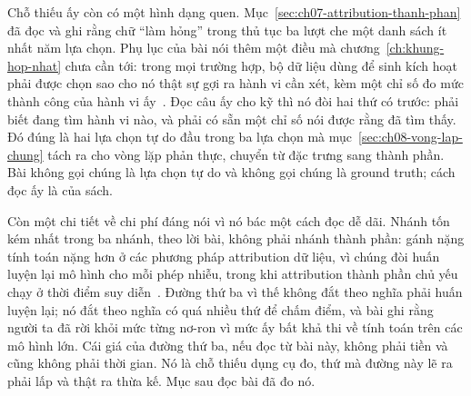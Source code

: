 %
Chỗ thiếu ấy còn có một hình dạng quen.
Mục~\ref{sec:ch07-attribution-thanh-phan} đã đọc
 và ghi rằng chữ
\enquote{làm hỏng} trong thủ tục ba lượt che một danh sách ít nhất năm lựa chọn.
Phụ lục của bài nói thêm một điều mà chương~\ref{ch:khung-hop-nhat} chưa cần
tới: trong mọi trường hợp, bộ dữ liệu dùng để sinh kích hoạt phải được chọn sao
cho nó thật sự gợi ra hành vi cần xét, kèm một chỉ số đo mức thành công của hành
vi ấy~\autocite{p18unified}. Đọc câu ấy cho kỹ thì nó đòi hai thứ có trước: phải
biết đang tìm hành vi nào, và phải có sẵn một chỉ số nói được rằng đã tìm thấy.
Đó đúng là hai lựa chọn tự do đầu trong ba lựa chọn mà
mục~\ref{sec:ch08-vong-lap-chung} tách ra cho vòng lặp phản thực, chuyển từ đặc
trưng sang thành phần. Bài không gọi chúng là lựa chọn tự do và không gọi chúng
là ground truth; cách đọc ấy là của sách.

%
Còn một chi tiết về chi phí đáng nói vì nó bác một cách đọc dễ dãi. Nhánh tốn
kém nhất trong ba nhánh, theo lời bài, không phải nhánh thành phần: gánh nặng
tính toán nặng hơn ở các phương pháp attribution dữ liệu, vì chúng đòi huấn
luyện lại mô hình cho mỗi phép nhiễu, trong khi attribution thành phần chủ yếu
chạy ở thời điểm suy diễn~\autocite{p18unified}. Đường thứ ba vì thế không đắt
theo nghĩa phải huấn luyện lại; nó đắt theo nghĩa có quá nhiều thứ để chấm điểm,
và bài ghi rằng người ta đã rời khỏi mức từng nơ-ron vì mức ấy bất khả thi về
tính toán trên các mô hình lớn. Cái giá của đường thứ ba, nếu đọc từ bài này,
không phải tiền và cũng không phải thời gian. Nó là chỗ thiếu dụng cụ đo, thứ mà
đường này lẽ ra phải lấp và thật ra thừa kế. Mục sau đọc bài đã đo nó.
